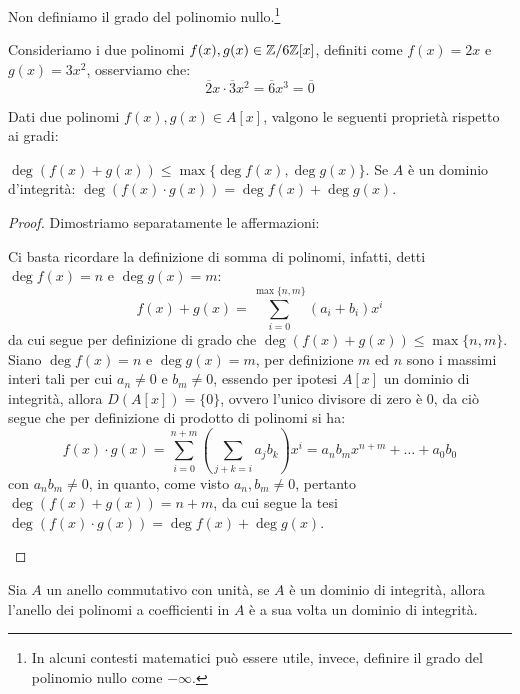 \documentclass[11pt]{scrartcl}
\begin{document}
\begin{remark}
Non definiamo il grado del polinomio nullo.\footnote{In alcuni contesti matematici può essere utile, invece, definire il grado del polinomio nullo come $-\infty$.}
\end{remark}

\begin{example}
Consideriamo i due polinomi $f(x),g(x) \in \mathbb Z/6\mathbb Z[x]$, definiti come $f(x) = 2x$ e $g(x) = 3x^2$, osserviamo che:
	\[ \overline 2x \cdot \overline 3x^2 = \overline 6x^3 = \overline 0
	\]
\end{example}

\begin{theorem}
Dati due polinomi $f(x),g(x) \in A[x]$, valgono le seguenti proprietà rispetto ai gradi:
	\begin{enumerate}[(1)]
	\ii $\deg (f(x) + g(x)) \leq \max\{\deg f(x), \deg g(x)\}$.
	\ii Se $A$ è un dominio d'integrità: $\deg (f(x) \cdot g(x)) = \deg f(x) + \deg g(x)$.
	\end{enumerate}
\end{theorem}

\begin{proof}
Dimostriamo separatamente le affermazioni:
	\begin{enumerate}[(1)]
	\ii Ci basta ricordare la definizione di somma di polinomi, infatti, detti $\deg f(x) = n$ e $\deg g(x) = m$:
		\[ f(x) + g(x) = \sum_{i=0}^{\max\{n,m\}}(a_i+b_i)x^i
		\]
	da cui segue per definizione di grado che $\deg(f(x)+g(x)) \leq \max\{n,m\}$.
	\ii Siano $\deg f(x) = n$ e $\deg g(x) = m$, per definizione $m$ ed $n$ sono i massimi interi tali per cui $a_n \ne 0$ e $b_m \ne 0$, essendo per ipotesi $A[x]$ un dominio di integrità, allora $D(A[x]) = \{0\}$, ovvero l'unico divisore di zero è $0$, da ciò segue che per definizione di prodotto di polinomi si ha:
		\[ f(x) \cdot g(x) = \sum_{i=0}^{n+m}\left(\sum_{j+k=i}a_jb_k\right)x^i = a_nb_mx^{n+m} + \ldots + a_0b_0
		\]
		con $a_nb_m \ne 0$, in quanto, come visto $a_n, b_m \ne 0$, pertanto $\deg(f(x)+g(x)) = n+m$, da cui segue la tesi $\deg(f(x) \cdot g(x)) = \deg f(x) + \deg g(x)$.
	\end{enumerate}
\end{proof}

\begin{corollary}
\label{p:3.10}
Sia $A$ un anello commutativo con unità, se $A$ è un dominio di integrità, allora l'anello dei polinomi a coefficienti in $A$ è a sua volta un dominio di integrità.
\end{corollary}
\end{document}
